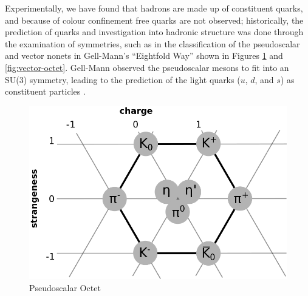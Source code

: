 \documentclass[aps,prd,onecolumn,showpacs,amsmath,amssymb,nofootinbib]{revtex4} \pdfoutput=1
\newcommand{\groupsu}[1]{S\!U(#1)}
\begin{document}
Experimentally, we have found that hadrons are made up of constituent quarks, and because of colour confinement free quarks are not observed; historically, the prediction of quarks and investigation into hadronic structure was done through the examination of symmetries, such as in the classification of the pseudoscalar and vector nonets in Gell-Mann's ``Eightfold Way'' \cite{GellMann1962} shown in Figures \ref{fig:meson-octet} and \ref{fig:vector-octet}. Gell-Mann observed the pseudoscalar mesons to fit into an \groupsu{3} symmetry, leading to the prediction of the light quarks ($u$, $d$, and $s$) as constituent particles \cite{GellMann1964, Zweig1964}.
\begin{figure}[!ht]
    \centering
    \includegraphics[scale=0.5]{octet.png}
    \caption{Pseudoscalar Octet}
    \label{fig:meson-octet}
\end{figure}
\end{document}
